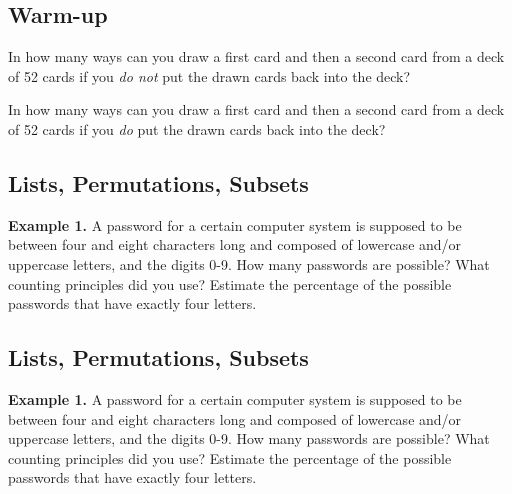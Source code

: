 \documentclass[12pt, letterpaper]{article}
\theoremstyle{definition}
\begin{document}
\subsection*{Warm-up}

\vspace*{1in}\noindent
In how many ways can you draw a first card and then a second card from a deck
of 52 cards if you \emph{do not} put the drawn cards back into the deck?

\vspace*{0.4in}\noindent
In how many ways can you draw a first card and then a second card from a deck
of 52 cards if you \emph{do} put the drawn cards back into the deck?

\clearpage\pagebreak\noindent
\subsection*{Lists, Permutations, Subsets}

\noindent
\textbf{Example 1.}
A password for a certain computer system is supposed to be between four
and eight characters long and composed of lowercase and/or uppercase
letters, and the digits 0-9. How many passwords are possible? What counting
principles did you use? Estimate the percentage of the possible passwords that
have exactly four letters.


\clearpage\pagebreak\noindent
\subsection*{Lists, Permutations, Subsets}

\noindent
\textbf{Example 1.}
A password for a certain computer system is supposed to be between four
and eight characters long and composed of lowercase and/or uppercase
letters, and the digits 0-9. How many passwords are possible? What counting
principles did you use? Estimate the percentage of the possible passwords that
have exactly four letters.
\end{document}

